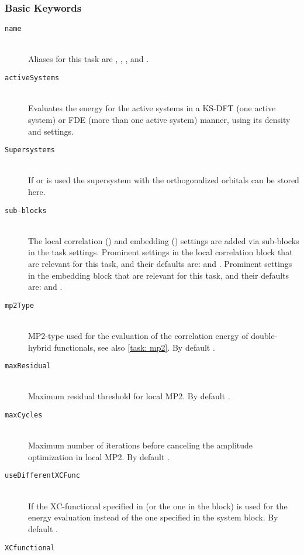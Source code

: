 \subsubsection{Basic Keywords}
\begin{description}
  \item [\texttt{name}]\hfill \\
  Aliases for this task are , , , and .
  \item [\texttt{activeSystems}]\hfill \\
   Evaluates the energy for the active systems in a KS-DFT (one active system)
   or FDE (more than one active system) manner, using its density and settings.
   \item [\texttt{Supersystems}]\hfill \\
   If  or  is used the supersystem with the orthogonalized orbitals can be 
   stored here.
   \item [\texttt{sub-blocks}]\hfill \\
   The local correlation () and embedding () settings are added via sub-blocks in the task settings.
   Prominent settings in the local correlation block that are relevant for this task, and their defaults are:
     and .
    Prominent settings in the embedding block that are relevant for this task, and their defaults are: 
    and .
    \item [\texttt{mp2Type}]\hfill \\
    MP2-type used for the evaluation of the correlation energy of double-hybrid functionals, see also \ref{task: mp2}. By default .
    \item [\texttt{maxResidual}]\hfill \\
    Maximum residual threshold for local MP2. By default .
    \item [\texttt{maxCycles}]\hfill \\
    Maximum number of iterations before canceling the amplitude optimization in local MP2. By default .
    \item [\texttt{useDifferentXCFunc}]\hfill \\
    If  the XC-functional specified in  (or the one in the  block) is used for the energy evaluation instead of the
    one specified in the system block. By default .
    \item [\texttt{XCfunctional}]\hfill \\

\end{description}
